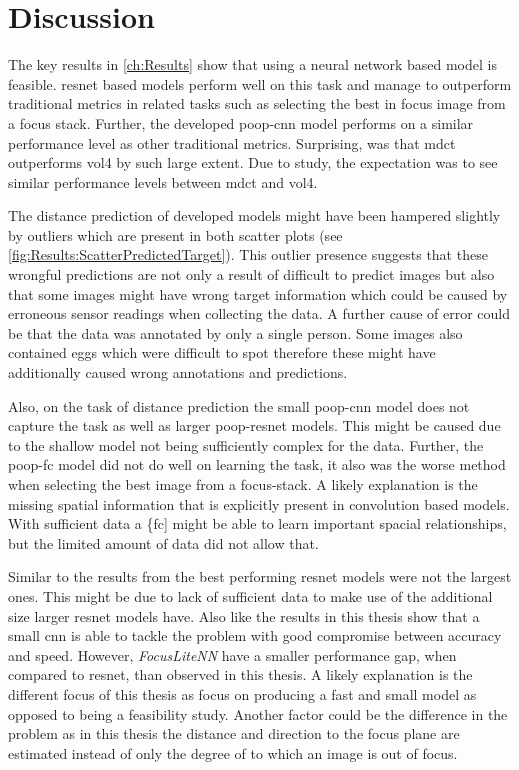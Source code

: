 \chapter{Discussion}
\label{ch:Discussion}

The key results in \autoref{ch:Results} show that using a neural network based model is feasible. \Ac{resnet} based models perform well on this task and manage to outperform traditional metrics in related tasks such as selecting the best in focus image from a focus stack. Further, the developed \ac{poop}-\ac{cnn} model performs on a similar performance level as other traditional metrics. Surprising, was that \ac{mdct} outperforms \ac{vol4} by such large extent. Due to \textcite{mateos-perez2012comparative} study, the expectation was to see similar performance levels between \ac{mdct} and \ac{vol4}.

The distance prediction of developed models might have been hampered slightly by outliers which are present in both scatter plots (see \autoref{fig:Results:ScatterPredictedTarget}). This outlier presence suggests that these wrongful predictions are not only a result of difficult to predict images but also that some images might have wrong target information which could be caused by erroneous sensor readings when collecting the data. A further cause of error could be that the data was annotated by only a single person. Some images also contained eggs which were difficult to spot therefore these might have additionally caused wrong annotations and predictions.

Also, on the task of distance prediction the small \ac{poop}-{cnn} model does not capture the task as well as larger \ac{poop}-\ac{resnet} models. This might be caused due to the shallow model not being sufficiently complex for the data. Further, the \ac{poop}-\ac{fc} model did not do well on learning the task, it also was the worse method when selecting the best image from a focus-stack. A likely explanation is the missing spatial information that is explicitly present in convolution based models. With sufficient data a \{fc] might be able to learn important spacial relationships, but the limited amount of data did not allow that.

Similar to the results from \textcite{wang2020focuslitenn} the best performing \ac{resnet} models were not the largest ones. This might be due to lack of sufficient data to make use of the additional size larger \ac{resnet} models have. Also like \citeauthor{wang2020focuslitenn} the results in this thesis show that a small \ac{cnn} is able to tackle the problem with good compromise between accuracy and speed. However, \citeauthor{wang2020focuslitenn} \textit{FocusLiteNN} have a smaller performance gap, when compared to \ac{resnet}, than observed in this thesis. A likely explanation is the different focus of this thesis as \citeauthor{wang2020focuslitenn} focus on producing a fast and small model as opposed to being a feasibility study. Another factor could be the difference in the problem as in this thesis the distance and direction to the focus plane are estimated instead of only the degree of to which an image is out of focus.

